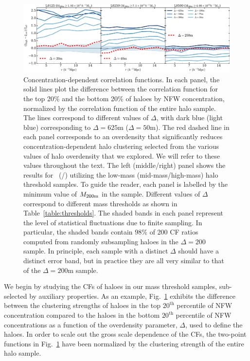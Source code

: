 \documentclass[usenatbib,fleqn]{mnras}
\begin{document}
\begin{figure}
	\centering
	\includegraphics[width=\textwidth]{all_cfcompare_cnfw.pdf}
	\caption{
Concentration-dependent correlation functions. In each panel, the solid lines plot the difference between the correlation function for the top 20\% and the bottom 20\% of haloes by NFW concentration, normalized by the correlation function of the entire halo sample. The lines correspond to different values of $\Delta$, with dark blue (light blue) corresponding to $\Delta = 625$m ($\Delta = 50$m). The red dashed line in each panel  corresponds to an overdensity that significantly reduces concentration-dependent halo clustering selected from the various values of halo overdensity that we explored. We will refer to these values throughout the text. The left (middle/right) panel shows the results for \simA \ (\simB /\simC) utilizing the low-mass (mid-mass/high-mass) halo threshold samples. To guide the reader, each panel is labelled by the minimum value of $M_{200{\rm m}}$ in the sample. Different values of $\Delta$ correspond to different mass thresholds as shown in Table~\ref{table:thresholds}. The shaded bands in each panel represent the level of statistical fluctuations due to finite sampling. In particular, the shaded bands contain $98\%$ of 200 CF ratios computed from randomly subsampling haloes in the $\Delta=200$ sample. In principle, each sample with a distinct $\Delta$ should have a distinct error band, but in practice they are all very similar to that of the $\Delta=200$m sample.
}
\label{fig:cc_cfcompare}
\end{figure}

We begin by studying the CFs of haloes in our mass threshold samples, sub-selected by auxiliary properties. As an example, Fig.~\ref{fig:cc_cfcompare} exhibits the difference between the clustering strengths of haloes in the top $20^{\mathrm{th}}$ percentile of NFW concentration compared to the haloes in the
bottom $20^{\mathrm{th}}$ percentile of NFW concentrations as a function of the overdensity parameter, $\Delta$, used to define the haloes. In order to scale out the gross scale dependence of the CFs, the two-point functions in Fig.~\ref{fig:cc_cfcompare} have been normalized by the clustering strength of the entire halo sample. 
\end{document}
